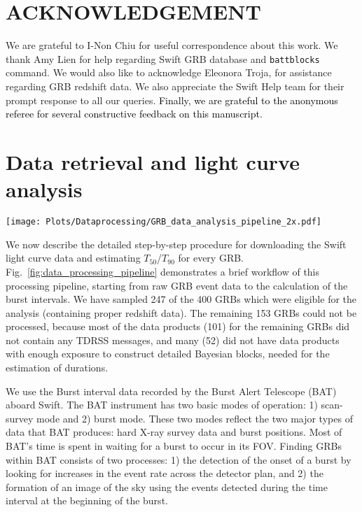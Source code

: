 \documentclass[prd,nofootinbib,preprintnumbers,floatfix]{revtex4}  %
\newcommand{\rthis}[1]{\textcolor{black}{#1}}
\begin{document}
\section*{ACKNOWLEDGEMENT}
We are grateful to I-Non Chiu for useful correspondence about this work. We thank Amy Lien  for help regarding Swift GRB database and {\tt battblocks} command. We would also like to acknowledge Eleonora Troja,  for  assistance regarding GRB redshift data. We also appreciate the  Swift Help team for their prompt response to all our queries. \rthis{Finally, we are grateful to the anonymous referee for several constructive feedback on this manuscript.}


\appendix

\section{Data retrieval and light curve analysis}
\label{app}
\begin{figure*}
\centering
\texttt{[image: Plots/Dataprocessing/GRB\_data\_analysis\_pipeline\_2x.pdf]}
\caption{A brief data processing pipeline for our analysis of the GRB samples obtained from the latest Swift catalog. The yellow boxes denote the type of products obtained and the black pointers represent the type of command used to generate those products.}
\label{fig:data_processing_pipeline}
\end{figure*}

We now describe the detailed step-by-step procedure for downloading the Swift light curve data and estimating $T_{50}$/$T_{90}$ for every GRB. Fig.~\ref{fig:data_processing_pipeline} demonstrates a brief workflow of this processing pipeline, starting from raw GRB event data to the calculation of the burst intervals.
We have sampled 247 of the 400 GRBs which were eligible for the analysis (containing proper redshift data). The remaining  153 GRBs could not be processed, because most  of the data products (101) for the remaining GRBs did not contain any TDRSS messages, and many (52) did not have data products with enough exposure to construct detailed Bayesian blocks, needed for the estimation of durations.





We use the Burst interval data recorded by the Burst Alert Telescope (BAT) aboard  Swift. The BAT instrument has two basic modes of operation: 1) scan-survey mode and 2) burst mode.
These two modes reflect the two major types of data that BAT produces: hard X-ray survey data and burst positions. Most of BAT’s time is spent in waiting for a burst to occur in its FOV. Finding GRBs within BAT consists of two processes: 1) the detection of the onset of a burst by looking for increases in the event rate across the detector plan, and 2) the formation of an image of the sky using the events detected during the time interval at the beginning of the burst. \cite{markwardt2007Swift}
\end{document}
